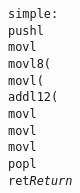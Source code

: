 \begin{alltt}
simple:{\em\scriptsize }
  pushl %ebp      {\em\scriptsize  Save frame pointer}
  movl %esp,%ebp  {\em\scriptsize  Create new frame pointer}
  movl 8(%ebp),%eax {\em\scriptsize  Get {\tt xp}}
  movl (%eax),%edx  {\em\scriptsize  Retrieve {\tt *xp}}
  addl 12(%ebp),%edx {\em\scriptsize  Add {\tt y} to get {\tt t}}
  movl %edx,(%eax) {\em\scriptsize  Store {\tt t} at {\tt *xp}}
  movl %edx,%eax {\em\scriptsize  Set {\tt t} as return value}
  movl %ebp,%esp {\em\scriptsize  Reset stack pointer}
  popl %ebp {\em\scriptsize  Reset frame pointer}
  ret {\em\scriptsize  Return}
\end{alltt}
